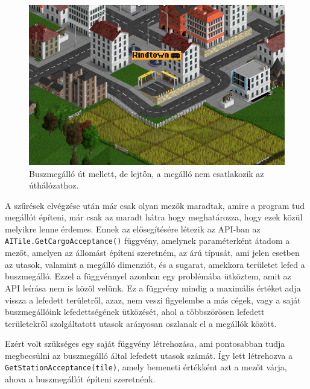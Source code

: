 \begin{figure}[h!]
	\centering
	\includegraphics[width=\textwidth]{images/lejtomegallo.png}
	\caption{Buszmegálló út mellett, de lejtőn, a megálló nem csatlakozik az úthálózathoz.}
	\label{fig:lejtomegallo}
\end{figure}

A szűrések elvégzése után már csak olyan mezők maradtak, amire a program tud megállót építeni, már csak az maradt hátra hogy meghatározza, hogy ezek közül melyikre lenne érdemes. Ennek az elősegítésére létezik az API-ban az \\ \texttt{AITile.GetCargoAcceptance()} függvény, amelynek paraméterként átadom a mezőt, amelyen az állomást építeni szeretném, az árú típusát, ami jelen esetben az utasok, valamint a megálló dimenziót, és a sugarat, amekkora területet lefed a buszmegálló. Ezzel a függvénnyel azonban egy problémába ütköztem, amit az API leírása nem is közöl velünk. Ez a függvény mindig a maximális értéket adja vissza a lefedett területről, azaz, nem veszi figyelembe a más cégek, vagy a saját buszmegállóink lefedettségének ütközését, ahol a többszörösen lefedett területekről szolgáltatott utasok arányosan oszlanak el a megállók között.

Ezért volt szükséges egy saját függvény létrehozása, ami pontosabban tudja megbecsülni az buszmegálló által lefedett utasok számát. Így lett létrehozva a \\ \texttt{GetStationAcceptance(tile)}, amely bemeneti értékként azt a mezőt várja, ahova a buszmegállót építeni szeretnénk.

